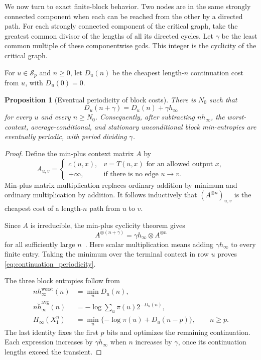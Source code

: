\documentclass[11pt,a4paper]{article}
\newtheorem{proposition}[theorem]{Proposition}
\begin{document}
We now turn to exact finite-block behavior.  Two nodes are in the same
strongly connected component when each can be reached from the other
by a directed path.  For each strongly connected component of the
critical graph, take the greatest common divisor of the lengths of all
its directed cycles.  Let $\gamma$ be the least common multiple of
these componentwise gcds.  This integer is the cyclicity of the
critical graph.

For $u\in\mathcal S_p$ and $n\ge0$, let $D_u(n)$ be the cheapest
length-$n$ continuation cost from $u$, with $D_u(0)=0$.

\begin{proposition}[Eventual periodicity of block costs]
\label{prop:block_periodicity}
There is $N_0$ such that
\begin{equation}
\label{eq:continuation_periodicity}
    D_u(n+\gamma)=D_u(n)+\gamma h_\infty
\end{equation}
for every $u$ and every $n\ge N_0$.  Consequently, after subtracting
$n h_\infty$, the worst-context, average-conditional, and stationary
unconditional block min-entropies are eventually periodic, with period
dividing $\gamma$.
\end{proposition}

\begin{proof}
Define the min-plus context matrix $A$ by
\[
    A_{u,v}=
    \begin{cases}
      c(u,x),&v=T(u,x)\text{ for an allowed output }x,\\
      +\infty,&\text{if there is no edge }u\to v.
    \end{cases}
\]
Min-plus matrix multiplication replaces ordinary addition by minimum
and ordinary multiplication by addition.  It follows inductively that
$(A^{\otimes n})_{u,v}$ is the cheapest cost of a length-$n$ path from
$u$ to $v$.

Since $A$ is irreducible, the min-plus cyclicity theorem gives
\[
    A^{\otimes(n+\gamma)}=\gamma h_\infty\otimes A^{\otimes n}
\]
for all sufficiently large $n$~\cite{baccelli1992synchronization}.
Here scalar multiplication means adding $\gamma h_\infty$ to every
finite entry.  Taking the minimum over the terminal context in row
$u$ proves \eqref{eq:continuation_periodicity}.

The three block entropies follow from
\begin{align*}
    n h_\infty^{\mathrm{worst}}(n)&=\min_uD_u(n),\\
    n\widetilde h_\infty^{\mathrm{avg}}(n)
        &=-\log\sum_u\pi(u)2^{-D_u(n)},\\
    H_\infty(X_1^n)&=\min_u\{-\log\pi(u)+D_u(n-p)\},\qquad n\ge p.
\end{align*}
The last identity fixes the first $p$ bits and optimizes the remaining
continuation.  Each expression increases by $\gamma h_\infty$ when
$n$ increases by $\gamma$, once its continuation lengths exceed the
transient.
\end{proof}
\end{document}
